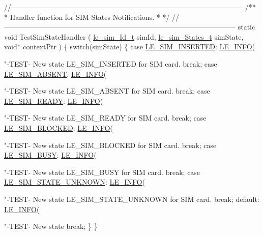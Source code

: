 \begin{DoxyCodeInclude}
{{{\textcolor{comment}{//--------------------------------------------------------------------------------------------------}\textcolor{comment}{}
\textcolor{comment}{/**}
\textcolor{comment}{ * Handler function for SIM States Notifications.}
\textcolor{comment}{ *}
\textcolor{comment}{ */}
\textcolor{comment}{//--------------------------------------------------------------------------------------------------}
\textcolor{keyword}{static} \textcolor{keywordtype}{void} TestSimStateHandler
(
    \hyperlink{le__sim__interface_8h_aace49df88426119626fb1ef4e544ccdd}{le\_sim\_Id\_t}     simId,
    \hyperlink{le__sim__interface_8h_a21b9bb7d5e5e7ece213e00738a5bae41}{le\_sim\_States\_t} simState,
    \textcolor{keywordtype}{void}*           contextPtr
)
\{
    \textcolor{keywordflow}{switch}(simState)
    \{
        \textcolor{keywordflow}{case} \hyperlink{le__sim__interface_8h_a21b9bb7d5e5e7ece213e00738a5bae41a86aea853ae5fcc1a2e3c8d352d8689d3}{LE\_SIM\_INSERTED}:
            \hyperlink{le__log_8h_a23e6d206faa64f612045d688cdde5808}{LE\_INFO}(\textcolor{stringliteral}{"-TEST- New state LE\_SIM\_INSERTED for SIM card.%
            \textcolor{keywordflow}{break};
        \textcolor{keywordflow}{case} \hyperlink{le__sim__interface_8h_a21b9bb7d5e5e7ece213e00738a5bae41a813e26946372fbc3960aa97713b6ca2f}{LE\_SIM\_ABSENT}:
            \hyperlink{le__log_8h_a23e6d206faa64f612045d688cdde5808}{LE\_INFO}(\textcolor{stringliteral}{"-TEST- New state LE\_SIM\_ABSENT for SIM card.%
            \textcolor{keywordflow}{break};
        \textcolor{keywordflow}{case} \hyperlink{le__sim__interface_8h_a21b9bb7d5e5e7ece213e00738a5bae41aa7f1f6c3391e32af8ce3ba2242276d64}{LE\_SIM\_READY}:
            \hyperlink{le__log_8h_a23e6d206faa64f612045d688cdde5808}{LE\_INFO}(\textcolor{stringliteral}{"-TEST- New state LE\_SIM\_READY for SIM card.%
            \textcolor{keywordflow}{break};
        \textcolor{keywordflow}{case} \hyperlink{le__sim__interface_8h_a21b9bb7d5e5e7ece213e00738a5bae41af83b91131d516ad3756781108000515a}{LE\_SIM\_BLOCKED}:
            \hyperlink{le__log_8h_a23e6d206faa64f612045d688cdde5808}{LE\_INFO}(\textcolor{stringliteral}{"-TEST- New state LE\_SIM\_BLOCKED for SIM card.%
            \textcolor{keywordflow}{break};
        \textcolor{keywordflow}{case} \hyperlink{le__sim__interface_8h_a21b9bb7d5e5e7ece213e00738a5bae41a944435801d6359050dc37092396ca951}{LE\_SIM\_BUSY}:
            \hyperlink{le__log_8h_a23e6d206faa64f612045d688cdde5808}{LE\_INFO}(\textcolor{stringliteral}{"-TEST- New state LE\_SIM\_BUSY for SIM card.%
            \textcolor{keywordflow}{break};
        \textcolor{keywordflow}{case} \hyperlink{le__sim__interface_8h_a21b9bb7d5e5e7ece213e00738a5bae41ad82522676bf094ea402a0311356e434f}{LE\_SIM\_STATE\_UNKNOWN}:
            \hyperlink{le__log_8h_a23e6d206faa64f612045d688cdde5808}{LE\_INFO}(\textcolor{stringliteral}{"-TEST- New state LE\_SIM\_STATE\_UNKNOWN for SIM card.%
            \textcolor{keywordflow}{break};
        \textcolor{keywordflow}{default}:
            \hyperlink{le__log_8h_a23e6d206faa64f612045d688cdde5808}{LE\_INFO}(\textcolor{stringliteral}{"-TEST- New state %
            \textcolor{keywordflow}{break};
    \}
\}

}}}}}}}}}}
\end{DoxyCodeInclude}
